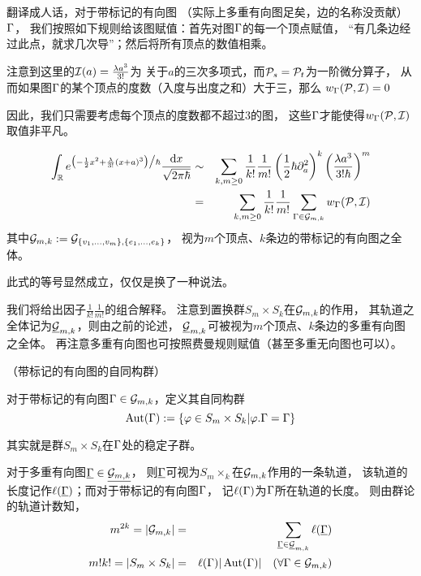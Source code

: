 翻译成人话，对于带标记的有向图
（实际上多重有向图足矣，边的名称没贡献）$\Gamma$，
我们按照如下规则给该图赋值：首先对图$\Gamma$的每一个顶点赋值，
“有几条边经过此点，就求几次导”；然后将所有顶点的数值相乘。

\begin{example}注意到这里的$\mathcal{I}(a)=\frac{\lambda a^3}{3!}$为
关于$a$的三次多项式，而$\mathcal{P}_s=\mathcal{P}_t$为一阶微分算子，
从而如果图$\Gamma$的某个顶点的度数（入度与出度之和）大于三，那么
$w_\Gamma(\mathcal{P},\mathcal{I})=0$
\end{example}
因此，我们只需要考虑每个顶点的度数都不超过$3$的图，
这些$\Gamma$才能使得$w_\Gamma(\mathcal{P},\mathcal{I})$取值非平凡。


\begin{lemma}
\begin{eqnarray*}
     \int_{\mathbb{R}}
       e^{\big(
            -\frac{1}{2}x^2
            +\frac{\lambda}{3!}(x+a)^3
          \big)
          \big/\hbar}
       \frac{\mathrm{d} x}{\sqrt{2\pi\hbar}}
&\sim&
     \sum_{k,m\geq 0}
       \frac{1}{k!}
       \frac{1}{m!}
       \left(
         \frac{1}{2}\hbar\partial_a^2
       \right)^k
       \left(
         \frac{\lambda a^3}{3!\hbar}
       \right)^m\\
&=&
     \sum_{k,m\geq 0}
       \frac{1}{k!}
       \frac{1}{m!}
       \sum_{\Gamma\in\mathcal{G}_{m,k}}
         w_\Gamma(\mathcal{P},\mathcal{I})
\end{eqnarray*}
其中$\mathcal{G}_{m,k}:=\mathcal{G}_{\{v_1,...,v_m\},\{e_1,...,e_k\}}$，
视为$m$个顶点、$k$条边的带标记的有向图之全体。
\end{lemma}
此式的等号显然成立，仅仅是换了一种说法。

我们将给出因子$\frac{1}{k!}\frac{1}{m!}$的组合解释。
注意到置换群$S_m\times S_k$在$\mathcal{G}_{m,k}$的作用，
其轨道之全体记为$\underline{\mathcal{G}}_{m,k}$，则由之前的论述，
$\underline{\mathcal{G}}_{m,k}$可被视为$m$个顶点、$k$条边的多重有向图之全体。
再注意多重有向图也可按照费曼规则赋值（甚至多重无向图也可以）。

\begin{definition}（带标记的有向图的自同构群）

对于带标记的有向图$\Gamma\in\mathcal{G}_{m,k}$，定义其自同构群
$$\operatorname{Aut}(\Gamma):=\{\varphi\in S_m\times S_k|\varphi.\Gamma=\Gamma\}$$
\end{definition}
其实就是群$S_m\times S_k$在$\Gamma$处的稳定子群。

对于多重有向图$\underline{\Gamma}\in\underline{\mathcal{G}_{m,k}}$，
则$\underline{\Gamma}$可视为$S_m\times_k$在$\mathcal{G}_{m,k}$作用的一条轨道，
该轨道的长度记作$\ell(\underline{\Gamma})$；而对于带标记的有向图$\Gamma$，
记$\ell(\Gamma)$为$\Gamma$所在轨道的长度。
则由群论的轨道计数知，
\begin{eqnarray*}
  m^{2k}=|\mathcal{G}_{m,k}|
&=&\sum_{\underline{\Gamma}\in\underline{\mathcal{G}}_{m,k}}
  \ell(\underline{\Gamma})
\\
m!k!=|S_m\times S_k|&=&
\ell(\Gamma)|\operatorname{Aut}(\Gamma)|\quad (\forall\Gamma\in\mathcal{G}_{m,k})
\end{eqnarray*}

